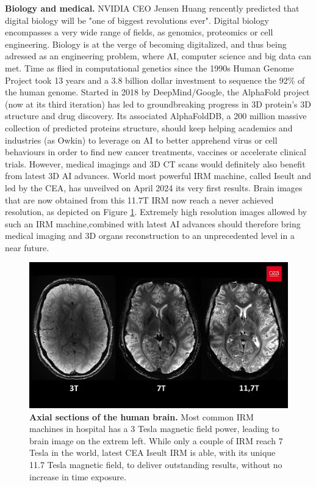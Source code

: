 \noindent \textbf{Biology and medical.} NVIDIA CEO Jensen Huang rencently predicted that digital biology will be "one of biggest revolutions ever". Digital biology encompasses a very wide range of fields, as genomics, proteomics or cell engineering. Biology is at the verge of becoming digitalized, and thus being adressed as an engineering problem, where \ac{AI}, computer science and big data can met. Time as flied in computational genetics since the 1990s Human Genome Project took 13 years and a 3.8 billion dollar investment to sequence the 92\% of the human genome. Started in 2018 by DeepMind/Google, the AlphaFold project (now at its third iteration) has led to groundbreaking progress in 3D protein's 3D structure and drug discovery. Its associated AlphaFoldDB, a 200 million massive collection of predicted proteins structure, should keep helping academics and industries (as Owkin) to leverage on \ac{AI} to better apprehend virus or cell behaviours in order to find new cancer treatments, vaccines or accelerate clinical trials. However, medical imagings and 3D CT scans would definitely also benefit from latest 3D \ac{AI} advances. World most powerful IRM machine, called Iseult and led by the CEA, has unveilved on April 2024 its very first results. Brain images that are now obtained from this 11.7T IRM now reach a never achieved resolution, as depicted on Figure \ref{fig:conclusion-ceaiseult}. Extremely high resolution images allowed by such an IRM machine,combined with latest \ac{AI} advances should therefore bring medical imaging and 3D organs reconstruction to an unprecedented level in a near future. 

\begin{figure}[htb!]
  \center
\includegraphics[width=\linewidth]{images/conclusion/cea-iseult.jpg}
\caption{\textbf{Axial sections of the human brain.} Most common IRM machines in hospital has a 3 Tesla magnetic field power, leading to brain image on the extrem left. While only a couple of IRM reach 7 Tesla in the world, latest CEA Iseult IRM is able, with its unique 11.7 Tesla magnetic field, to deliver outstanding results, without no increase in time exposure.}
\label{fig:conclusion-ceaiseult}
\end{figure}


